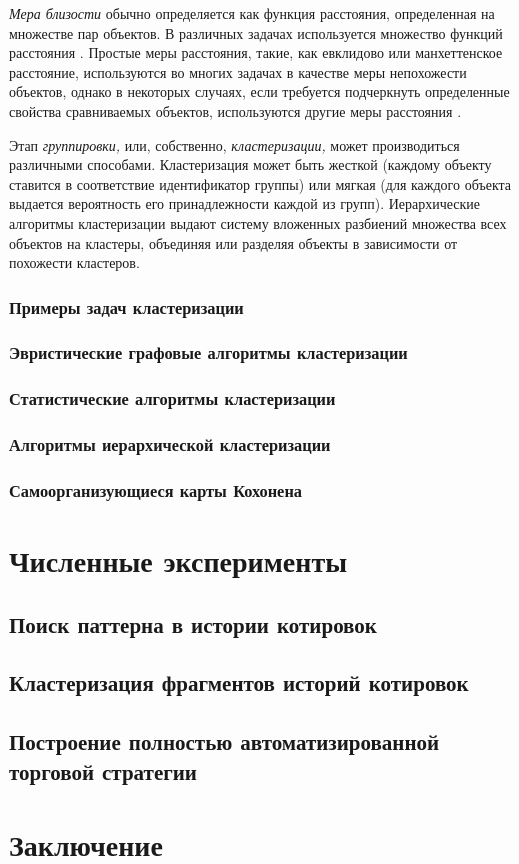 \documentclass[a4paper, 14pt]{extarticle}
\numberwithin{figure}{subsection}
\numberwithin{equation}{subsection}
\begin{document}
{\it Мера близости} обычно определяется как функция расстояния, определенная на множестве пар объектов. В различных задачах используется множество функций расстояния \cite{anderberg1973cluster, jain1988algorithms, diday1976clustering}. Простые меры расстояния, такие, как евклидово или манхеттенское расстояние, используются во многих задачах в качестве меры непохожести объектов, однако в некоторых случаях, если требуется подчеркнуть определенные свойства сравниваемых объектов, используются другие меры расстояния \cite{michalski1983automated, oates1999clustering}.

Этап {\it группировки,} или, собственно, {\it кластеризации,} может производиться различными способами. Кластеризация может быть жесткой (каждому объекту ставится в соответствие идентификатор группы) или мягкая (для каждого объекта выдается вероятность его принадлежности каждой из групп). Иерархические алгоритмы кластеризации выдают систему вложенных разбиений множества всех объектов на кластеры, объединяя или разделяя объекты в зависимости от похожести кластеров.
\subsubsection{Примеры задач кластеризации}
\subsubsection{Эвристические графовые алгоритмы кластеризации}
\subsubsection{Статистические алгоритмы кластеризации}
\subsubsection{Алгоритмы иерархической кластеризации}
\subsubsection{Самоорганизующиеся карты Кохонена}
\section{Численные эксперименты}
\subsection{Поиск паттерна в истории котировок}
\subsection{Кластеризация фрагментов историй котировок}
\subsection{Построение полностью автоматизированной торговой стратегии}
\section*{Заключение}
\newpage{}

\end{document}
